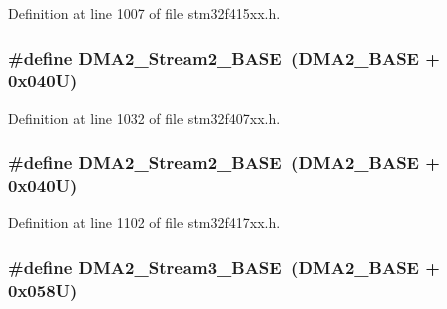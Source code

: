 Definition at line 1007 of file stm32f415xx.\+h.

\subsubsection[{\texorpdfstring{D\+M\+A2\+\_\+\+Stream2\+\_\+\+B\+A\+SE}{DMA2_Stream2_BASE}}]{\setlength{\rightskip}{0pt plus 5cm}\#define D\+M\+A2\+\_\+\+Stream2\+\_\+\+B\+A\+SE~({\bf D\+M\+A2\+\_\+\+B\+A\+SE} + 0x040\+U)}\hypertarget{group___peripheral__registers__structures_gaed33a06f08188466f2ede06160984e9a}{}\label{group___peripheral__registers__structures_gaed33a06f08188466f2ede06160984e9a}


Definition at line 1032 of file stm32f407xx.\+h.

\subsubsection[{\texorpdfstring{D\+M\+A2\+\_\+\+Stream2\+\_\+\+B\+A\+SE}{DMA2_Stream2_BASE}}]{\setlength{\rightskip}{0pt plus 5cm}\#define D\+M\+A2\+\_\+\+Stream2\+\_\+\+B\+A\+SE~({\bf D\+M\+A2\+\_\+\+B\+A\+SE} + 0x040\+U)}\hypertarget{group___peripheral__registers__structures_gaed33a06f08188466f2ede06160984e9a}{}\label{group___peripheral__registers__structures_gaed33a06f08188466f2ede06160984e9a}


Definition at line 1102 of file stm32f417xx.\+h.

\subsubsection[{\texorpdfstring{D\+M\+A2\+\_\+\+Stream3\+\_\+\+B\+A\+SE}{DMA2_Stream3_BASE}}]{\setlength{\rightskip}{0pt plus 5cm}\#define D\+M\+A2\+\_\+\+Stream3\+\_\+\+B\+A\+SE~({\bf D\+M\+A2\+\_\+\+B\+A\+SE} + 0x058\+U)}\hypertarget{group___peripheral__registers__structures_gaf3a9480e08c6ae94f4482e0cdaebdd17}{}\label{group___peripheral__registers__structures_gaf3a9480e08c6ae94f4482e0cdaebdd17}



